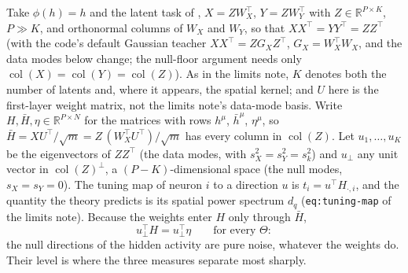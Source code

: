 \documentclass[11pt,a4paper]{article}
\newcommand{\R}{\mathbb R}
\newcommand{\col}{\operatorname{col}}
\newcommand{\hb}{\bar h}
\theoremstyle{remark}
\begin{document}
Take $\phi(h) = h$ and the latent task of ,
$X = ZW_X^\top$, $Y = ZW_Y^\top$ with $Z\in\R^{P\times K}$, $P\gg K$, and
orthonormal columns of $W_X$ and $W_Y$, so that $XX^\top = YY^\top = ZZ^\top$
(with the code's default Gaussian teacher $XX^\top = ZG_XZ^\top$,
$G_X = W_X^\top W_X$, and the data modes below change; the null-floor argument
needs only $\col(X) = \col(Y) = \col(Z)$). As in the limits note, $K$ denotes
both the number of latents and, where it appears, the spatial kernel; and
$U$ here is the first-layer weight matrix, not the limits note's data-mode
basis. Write $H,\bar H,\eta\in\R^{P\times N}$ for the matrices with rows
$h^\mu$, $\hb^\mu$, $\eta^\mu$, so $\bar H = XU^\top/\sqrt m = Z\,(W_X^\top U^\top)/\sqrt m$
has every column in $\col(Z)$. Let $u_1,\dots,u_K$ be the eigenvectors of
$ZZ^\top$ (the data modes, with $s_X^2 = s_Y^2 = s_k^2$) and $u_\perp$ any
unit vector in $\col(Z)^\perp$, a $(P-K)$-dimensional space (the null modes,
$s_X = s_Y = 0$). The tuning map of neuron $i$ to a direction $u$ is
$t_i = u^\top H_{\cdot,i}$, and the quantity the theory predicts is its
spatial power spectrum $d_q$ (\texttt{eq:tuning-map} of the limits note).
Because the weights enter $H$ only through $\bar H$,
\begin{equation}
  u_\perp^\top H = u_\perp^\top\eta
  \qquad\text{for every }\Theta:
  \label{eq:null-is-noise}
\end{equation}
the null directions of the hidden activity are pure noise, whatever the
weights do. Their level is where the three measures separate most sharply.
\end{document}
